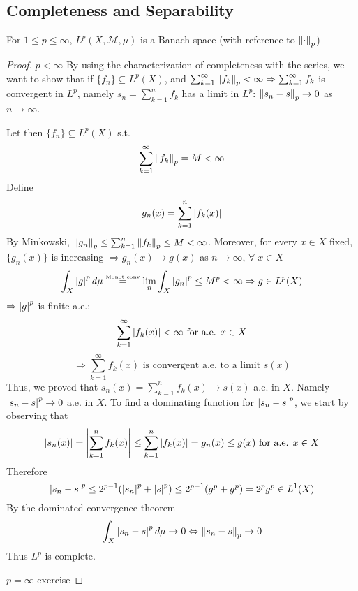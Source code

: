 \subsection*{Completeness and Separability}
\begin{theorem}
    For \(1 \leq p \leq \infty\), \(L^p(X, \mathcal{M}, \mu)\) is a Banach space (with reference to \(\norm{\cdot}_p\))
\end{theorem}
\begin{proof}
    \item \(p < \infty\)
    By using the characterization of completeness with the series, we want to show that 
    if \(\{f_n\} \subseteq L^p(X)\), and \(\sum_{k=1}^\infty\norm{f_k}_p < \infty \Rightarrow \sum_{k=1}^\infty f_k \) is convergent in \(L^p\), 
    namely \(s_n = \sum_{k=1}^n f_k\) has a limit in \(L^p\): \(\norm{s_n -s}_p \to 0 \) as \(n \to \infty\). 

    Let then \(\{f_n\} \subseteq L^p(X)\) s.t. 
    \[
        \sum_{k=1}^\infty \norm{f_k}_p = M < \infty 
    \]
    Define 
    \[
        g_n(x) = \sum_{k=1}^n \abs{f_k(x)}
    \]
    By Minkowski, \(\norm{g_n}_p \leq \sum_{k=1}^n \norm{f_k}_p \leq M < \infty\). 
    Moreover, for every \(x \in X\) fixed, \(\{g_n(x)\}\) is increasing \(\Rightarrow g_n(x) \to g(x)\) as \(n \to \infty\), \(\forall\; x \in X\)
    \[
        \int_X \abs{g}^p \, d\mu \overset{\text{\tiny{Monot conv}}}{=} \lim_n \int_X \abs{g_n}^p \leq M^p < \infty \Rightarrow g \in L^p(X)
    \]
    \(\Rightarrow \abs{g}^p \) is finite a.e.:
    \[
        \sum_{k=1}^\infty \abs{f_k(x)} < \infty \text{  for a.e. } x \in X
    \]
    \[
        \Rightarrow \sum_{k=1}^\infty f_k(x) \text{ is convergent a.e. to a limit } s(x)
    \]
    Thus, we proved that \(s_n(x) = \sum_{k=1}^n f_k(x) \to s(x)\) a.e. in \(X\). Namely \(\abs{s_n - s }^p \to 0\) a.e. in \(X\). To find a dominating function for \(\abs{s_n -s}^p\), we start by observing that
    \[
        \abs{s_n(x)} = \abs{\sum_{k=1}^n f_k(x)} \leq \sum_{k=1}^n \abs{f_k(x)} = g_n(x) \leq g(x) \text{ for a.e. } x \in X
    \]
    Therefore
    \[
        \abs{s_n -s }^p \leq 2^{p-1}(\abs{s_n}^p + \abs{s}^p) \leq 2^{p-1} (g^p + g^p ) = 2^p g^p \in L^1(X)
    \]
    By the dominated convergence theorem
    \[
        \int_X \abs{s_n -s }^p \, d\mu \to 0 \Leftrightarrow \norm{s_n -s}_p \to 0
    \]
    Thus \(L^p\) is complete.
    \item \(p=\infty\) exercise
\end{proof}

